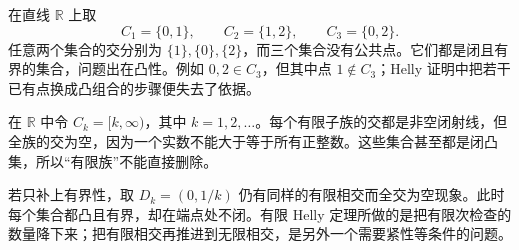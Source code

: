 \begin{example}\label{g1:exm:helly-nonconvex}
	在直线 \(\mathbb R\) 上取
	\[
		C_1=\{0,1\},\qquad C_2=\{1,2\},\qquad C_3=\{0,2\}.
	\]
	任意两个集合的交分别为 \(\{1\},\{0\},\{2\}\)，而三个集合没有公共点。它们都是闭且有界的集合，问题出在凸性。例如 \(0,2\in C_3\)，但其中点 \(1\notin C_3\)；Helly 证明中把若干已有点换成凸组合的步骤便失去了依据。
\end{example}

\begin{example}\label{g1:exm:helly-infinite-family}
	在 \(\mathbb R\) 中令 \(C_k=[k,\infty)\)，其中 \(k=1,2,\ldots\)。每个有限子族的交都是非空闭射线，但全族的交为空，因为一个实数不能大于等于所有正整数。这些集合甚至都是闭凸集，所以“有限族”不能直接删除。

	若只补上有界性，取 \(D_k=(0,1/k)\) 仍有同样的有限相交而全交为空现象。此时每个集合都凸且有界，却在端点处不闭。有限 Helly 定理所做的是把有限次检查的数量降下来；把有限相交再推进到无限相交，是另外一个需要紧性等条件的问题。
\end{example}
